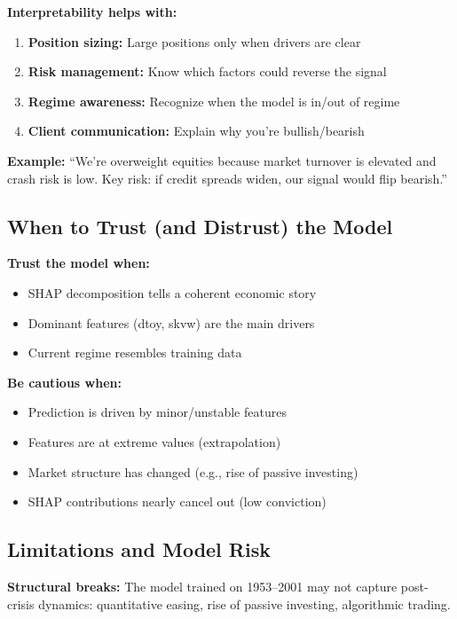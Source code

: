 \documentclass[11pt,a4paper]{article}
\begin{document}
\textbf{Interpretability helps with:}
\begin{enumerate}
    \item \textbf{Position sizing:} Large positions only when drivers are clear
    \item \textbf{Risk management:} Know which factors could reverse the signal
    \item \textbf{Regime awareness:} Recognize when the model is in/out of regime
    \item \textbf{Client communication:} Explain why you're bullish/bearish
\end{enumerate}

\textbf{Example:} ``We're overweight equities because market turnover is elevated and crash risk is low. Key risk: if credit spreads widen, our signal would flip bearish.''

\subsection{When to Trust (and Distrust) the Model}

\textbf{Trust the model when:}
\begin{itemize}
    \item SHAP decomposition tells a coherent economic story
    \item Dominant features (dtoy, skvw) are the main drivers
    \item Current regime resembles training data
\end{itemize}

\textbf{Be cautious when:}
\begin{itemize}
    \item Prediction is driven by minor/unstable features
    \item Features are at extreme values (extrapolation)
    \item Market structure has changed (e.g., rise of passive investing)
    \item SHAP contributions nearly cancel out (low conviction)
\end{itemize}

\subsection{Limitations and Model Risk}

\textbf{Structural breaks:} The model trained on 1953--2001 may not capture post-crisis dynamics: quantitative easing, rise of passive investing, algorithmic trading.
\end{document}
